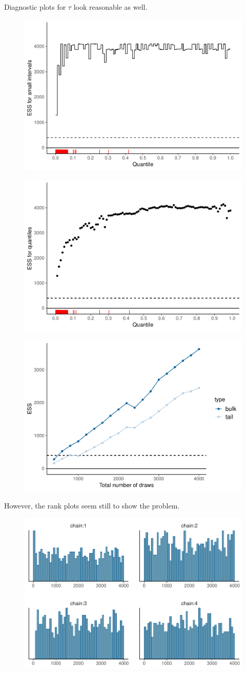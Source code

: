 \documentclass[american,]{article}
\begin{document}
Diagnostic plots for $\tau$ look reasonable as well.

\begin{figure}[tp]
  \centering
  \includegraphics[width=0.6\linewidth]{graphics/local-ess-fit-cp4-tau-1.pdf}
\end{figure}

\begin{figure}[tp]
  \centering
  \includegraphics[width=0.6\linewidth]{graphics/quantile-ess-fit-cp4-tau-1.pdf}
\end{figure}

\begin{figure}[tp]
  \centering
  \includegraphics[width=0.6\linewidth]{graphics/change-ess-fit-cp4-tau-1.pdf}
\end{figure}

However, the rank plots seem still to show the problem.

\begin{figure}[tp]
  \centering
  \includegraphics[width=0.6\linewidth]{graphics/hist-fit-cp4-tau-1.pdf}
\end{figure}
\end{document}
